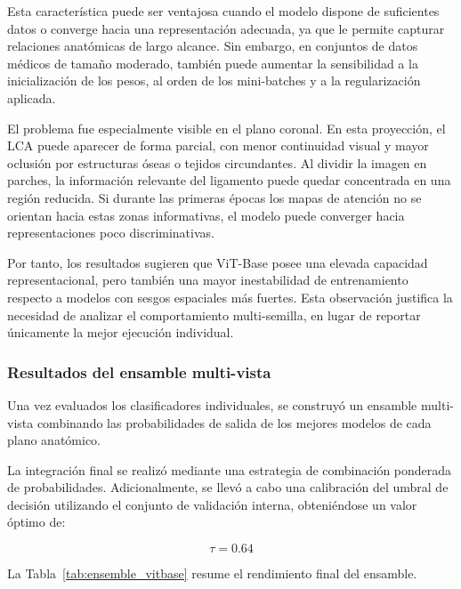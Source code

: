 Esta característica puede ser ventajosa cuando el modelo dispone de suficientes datos o converge hacia una representación adecuada, ya que le permite capturar relaciones anatómicas de largo alcance. Sin embargo, en conjuntos de datos médicos de tamaño moderado, también puede aumentar la sensibilidad a la inicialización de los pesos, al orden de los mini-batches y a la regularización aplicada.

El problema fue especialmente visible en el plano coronal. En esta proyección, el LCA puede aparecer de forma parcial, con menor continuidad visual y mayor oclusión por estructuras óseas o tejidos circundantes. Al dividir la imagen en parches, la información relevante del ligamento puede quedar concentrada en una región reducida. Si durante las primeras épocas los mapas de atención no se orientan hacia estas zonas informativas, el modelo puede converger hacia representaciones poco discriminativas.

Por tanto, los resultados sugieren que ViT-Base posee una elevada capacidad representacional, pero también una mayor inestabilidad de entrenamiento respecto a modelos con sesgos espaciales más fuertes. Esta observación justifica la necesidad de analizar el comportamiento multi-semilla, en lugar de reportar únicamente la mejor ejecución individual.

\subsubsection{Resultados del ensamble multi-vista}

Una vez evaluados los clasificadores individuales, se construyó un ensamble multi-vista combinando las probabilidades de salida de los mejores modelos de cada plano anatómico.

La integración final se realizó mediante una estrategia de combinación ponderada de probabilidades. Adicionalmente, se llevó a cabo una calibración del umbral de decisión utilizando el conjunto de validación interna, obteniéndose un valor óptimo de:

\begin{equation}
\tau = 0.64
\end{equation}

La Tabla~\ref{tab:ensemble_vitbase} resume el rendimiento final del ensamble.

